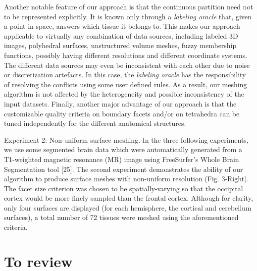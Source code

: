 {Another notable feature of our approach is that the continuous partition need not to be represented explicitly. It is known only through a {\it labeling oracle} that, given a point in space, answers which tissue it belongs to. This makes our approach applicable to virtually any combination of data sources, including labeled 3D images, polyhedral surfaces, unstructured volume meshes, fuzzy membership functions, possibly having different resolutions and different coordinate systems. The different data sources may even be inconsistent with each other due to noise or discretization artefacts. In this case, the {\it labeling oracle} has the responsibility of resolving the conflicts using some user defined rules. As a result, our meshing algorithm is not affected by the heterogeneity and possible inconsistency of the input datasets. Finally, another major advantage of our approach is that the customizable quality criteria on boundary facets and/or on tetrahedra can be tuned independently for the different anatomical structures.


Experiment 2: Non-uniform surface meshing. In the three following experiments, we use some segmented brain data which were automatically generated from a T1-weighted magnetic resonance (MR) image using FreeSurfer's Whole Brain Segmentation tool [25]. The second experiment demonstrates the ability of our algorithm to produce surface meshes with non-uniform resolution (Fig. 3-Right). The facet size criterion was chosen to be spatially-varying so that the occipital cortex would be more finely sampled than the frontal cortex. Although for clarity, only four surfaces are displayed (for each hemisphere, the cortical and cerebellum surfaces), a total number of 72 tissues were meshed using the aforementioned criteria.

}

\newpage


\section{To review}

